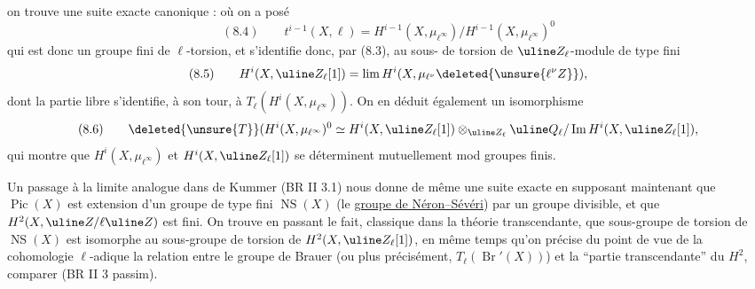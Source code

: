 


on trouve une suite exacte canonique :
où  on a posé
\[
(8.4)\qquad t^{i-1}(X,\ell)=H^{i-1}(X,\mu_{\ell^\infty})/H^{i-1}(X,\mu_{\ell^\infty})^0
\]
qui est donc un groupe fini de $\ell$-torsion, et s'identifie donc, par (8.3), au sous- de torsion de $\uline Z_\ell$-module de type fini
\[
(8.5)\qquad H^i(X,\uline Z_\ell[1])=\lim H^i(X,\mu_{\ell^\nu}\deleted{\unsure{\ell^\nu Z}}),
\]
dont la partie libre s'identifie, à son tour, à $T_\ell(H^i(X,\mu_{\ell^\infty}))$. On en déduit également un isomorphisme
\[
(8.6)\qquad \deleted{\unsure{T}}(H^i(X,\mu_{\ell^\infty})^0\simeq H^i(X,\uline Z_\ell[1])\otimes_{\uline Z_\ell}\uline Q_\ell/\operatorname{Im}H^i(X,\uline Z_\ell[1]),
\]
qui montre que $H^i(X,\mu_{\ell^\infty})$ et $H^i(X,\uline Z_\ell[1])$ se déterminent mutuellement mod groupes  finis.

 Un passage à la limite analogue dans  de Kummer (BR II 3.1) nous donne de même une suite exacte
en supposant maintenant que $\operatorname{Pic}(X)$ est extension d'un groupe de type fini $\operatorname{NS}(X)$ (le \uline{groupe de Néron--Sévéri}) par un groupe divisible, et que $H^2(X,\uline Z/\ell\uline Z)$ est fini. On trouve en passant le fait, classique dans la théorie transcendante, que  sous-groupe de torsion de $\operatorname{NS}(X)$ est isomorphe au sous-groupe de torsion de $H^2(X,\uline Z_\ell[1])$, en même temps qu'on précise du point de vue de la cohomologie $\ell$-adique la relation entre le groupe de Brauer (ou plus précisément, $T_\ell(\operatorname{Br}'(X))$) et la ``partie transcendante'' du $H^2$, comparer (BR II 3 passim).

